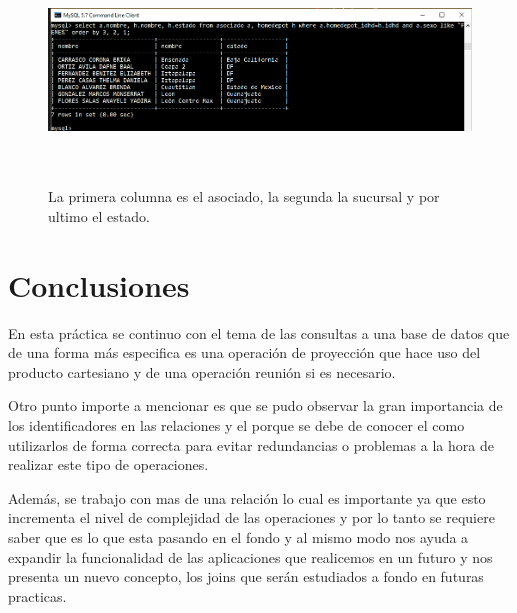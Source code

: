 \documentclass[12pt, titlepage]{article}
\begin{document}
 \begin{figure}[H]
	\begin{center}
		\includegraphics[width=16cm, height=6cm]{img/comando13.png}
		\caption{La primera columna es el asociado, la segunda la sucursal y por ultimo el estado.}
		\label{fig:comando13}
	\end{center}
\end{figure}
\section{Conclusiones}
En esta práctica se continuo con el tema de las consultas a una base de datos que de una forma más especifica es una operación de proyección que hace uso del producto cartesiano y de una operación reunión si es necesario.

Otro punto importe a mencionar es que se pudo observar la gran importancia de los identificadores en las relaciones y el porque se debe de conocer el como utilizarlos de forma correcta para evitar redundancias o problemas a la hora de realizar este tipo de operaciones.

Además, se trabajo con mas de una relación lo cual es importante ya que esto incrementa el nivel de complejidad de las operaciones y por lo tanto se requiere saber que es lo que esta pasando en el fondo y al mismo modo nos ayuda a expandir la funcionalidad de las aplicaciones que realicemos en un futuro y nos presenta un nuevo concepto, los joins que serán estudiados a fondo en futuras practicas.
 

\end{document}
